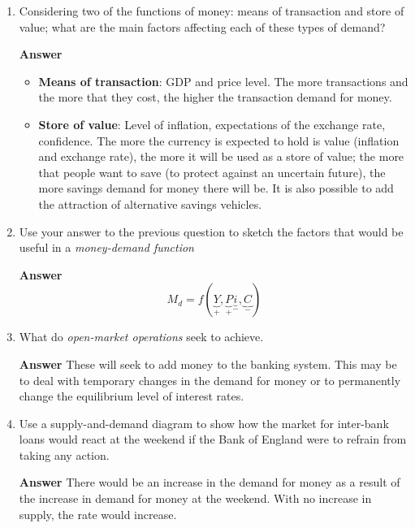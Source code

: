 \documentclass[14pt]{article}
\begin{document}
\begin{enumerate}
\item Considering two of the functions of money: means of transaction and store of value; what are the main factors affecting each of these types of demand?

\textbf{Answer}
\begin{itemize}
\item \textbf{Means of transaction}:  GDP and price level.  The more transactions and the more that they cost, the higher the transaction demand for money. 
\item \textbf{Store of value}: Level of inflation, expectations of the exchange rate, confidence.  The more the currency is expected to hold is value (inflation and exchange rate), the more it will be used as a store of value; the more that people want to save (to protect against an uncertain future), the more savings demand for money there will be. It is also possible to add the attraction of alternative savings vehicles. 
\end{itemize}

\item Use your answer to the previous question to sketch the factors that would be useful in a \emph{money-demand function}

\textbf{Answer}
\begin{equation*}
M_d = f(\underbrace{Y}_{+}, \underbrace{P}_{+} \underbrace{i}_{-}, \underbrace{C}_{-})
\end{equation*}

\item What do \emph{open-market operations} seek to achieve. 

\textbf{Answer}
These will seek to add money to the banking system. This may be to deal with temporary changes in the demand for money or to permanently change the equilibrium level of interest rates. 

\item Use a supply-and-demand diagram to show how the market for inter-bank loans would react at the weekend if the Bank of England were to refrain from taking any action. 

\textbf{Answer}
There would be an increase in the demand for money as a result of the increase in demand for money at the weekend.  With no increase in supply, the rate would increase. 


\end{enumerate}
\end{document}
